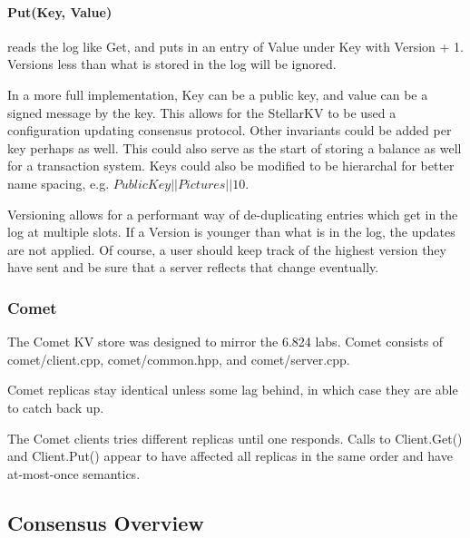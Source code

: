 \documentclass[preprint,11pt]{article} \usepackage{amsmath}
\begin{document}
\paragraph{Put(Key, Value)}  reads the log like Get, and puts in an entry of Value under Key with Version + 1. Versions less than what is stored in the log will be ignored.

In a more full implementation, Key can be a public key, and value can
be a signed message by the key. This allows for the StellarKV to be
used a configuration updating consensus protocol. Other invariants
could be added per key perhaps as well. This could also serve as the
start of storing a balance as well for a transaction system. Keys
could also be modified to be hierarchal for better name spacing, e.g.
$Public Key||Pictures||10$.

Versioning allows for a performant way of de-duplicating entries which
get in the log at multiple slots. If a Version is younger than what is
in the log, the updates are not applied. Of course, a user should keep
track of the highest version they have sent and be sure that a server
reflects that change eventually.

\subsubsection*{Comet}

The Comet KV store was designed to mirror the 6.824 labs. Comet consists of
comet/client.cpp, comet/common.hpp, and comet/server.cpp.

Comet replicas stay identical unless some lag behind, in which case they 
are able to catch back up.

The Comet clients tries different replicas until one responds. Calls to Client.Get() and
Client.Put() appear to have affected all replicas in the same order and have
at-most-once semantics.

\subsection{Consensus Overview}

\begingroup
\raggedright

\endgroup
\end{document}
